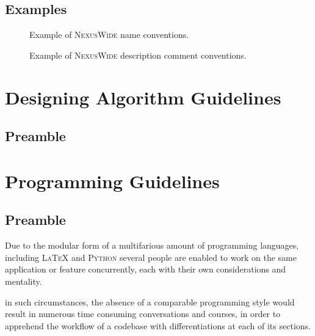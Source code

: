 \documentclass[13pt]{scrarticle}
\newcommand{\header}[1]{ \textsf{#1} \relax{}}
\newcommand{\name}[1]{{\textsc{#1}}}
\begin{document}
    \newpage
    \subsection{\header{Examples}}

        \begin{figure}[h!]
            \caption{Example of \name{NexusWide} name conventions.}
        \end{figure}

        \begin{figure}[h!]
            \caption{Example of \name{NexusWide} description comment conventions.}
        \end{figure}


     \section{\header{Designing Algorithm Guidelines}}
     \subsection{\header{Preamble}}


    \section{\header{Programming Guidelines}}
    \subsection{\header{Preamble}}


    Due to the modular form of a multifarious amount of programming languages,
    including \name{\LaTeX} and \name{Python}\footnotemark{}
    several people are enabled to work on the same application or feature concurrently,
    each with their own considerations and mentality. \newline

    in such circumstances, the absence of a comparable programming style would result in numerous time consuming conversations and courses,
    in order to apprehend the workflow of a codebase with differentiations at each of its sections. \newline
\end{document}
